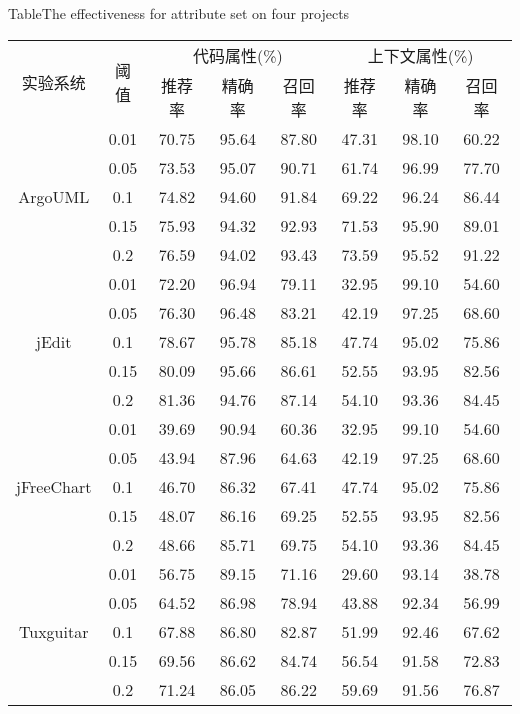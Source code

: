 \begin{table}[htbp]
{Table$\!$}{The effectiveness for attribute set on four projects}
\vspace{0.5em}
\centering
\wuhao
\begin{tabular}{cccccccc}
\toprule[1.5pt]
\multirow{2}{*}{实验系统}&\multirow{2}{*}{阈值}&\multicolumn{3}{c}{代码属性(\%)}&\multicolumn{3}{c}{上下文属性(\%)}\\
&&推荐率&精确率&召回率&推荐率&精确率&召回率\\
\midrule[1pt]
\multirow{5}{*}{ArgoUML}
&0.01&	70.75&	95.64&	87.80&	47.31&	98.10&	60.22\\
&0.05&	73.53&	95.07&	90.71&	61.74&	96.99&	77.70\\
&0.1&	74.82&	94.60&	91.84&	69.22&	96.24&	86.44\\
&0.15&	75.93&	94.32&	92.93&	71.53&	95.90&	89.01\\
&0.2&	76.59&	94.02&	93.43&	73.59&	95.52&	91.22\\
\hline
\multirow{5}{*}{jEdit}
&0.01&	72.20&    96.94&	79.11&	32.95&	99.10&	54.60\\
&0.05&	76.30&	96.48&	83.21&	42.19&	97.25&	68.60\\
&0.1&	78.67&	95.78&	85.18&	47.74&	95.02&	75.86\\
&0.15&	80.09&	95.66&	86.61&	52.55&	93.95&	82.56\\
&0.2&	81.36&	94.76&	87.14&	54.10&	93.36&	84.45\\
\hline
\multirow{5}{*}{jFreeChart}
&0.01&	39.69&	90.94&	60.36&	32.95&	99.10&	54.60\\
&0.05&	43.94&	87.96&	64.63&	42.19&	97.25&	68.60\\
&0.1&	46.70&	86.32&	67.41&	47.74&	95.02&	75.86\\
&0.15&	48.07&	86.16&	69.25&	52.55&	93.95&	82.56\\
&0.2&	48.66&	85.71&	69.75&	54.10&	93.36&	84.45\\
\hline
\multirow{5}{*}{Tuxguitar}
&0.01&	56.75&	89.15&	71.16&	29.60&	93.14&	38.78\\
&0.05&	64.52&	86.98&	78.94&	43.88&	92.34&	56.99\\
&0.1&	67.88&	86.80&	82.87&	51.99&	92.46&	67.62\\
&0.15&	69.56&	86.62&	84.74&	56.54&	91.58&	72.83\\
&0.2&	71.24&	86.05&	86.22&	59.69&	91.56&	76.87\\
\bottomrule[1.5pt]
\end{tabular}
\end{table}

